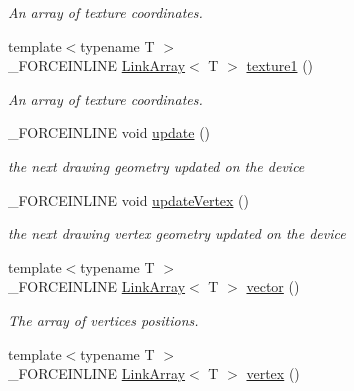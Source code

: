 \begin{DoxyCompactItemize}
\begin{DoxyCompactList}\small\item\em An array of texture coordinates. \end{DoxyCompactList}\item 
\hypertarget{classcsad_1_1_mesh_abe780b944ddb3c807305cfba8adfe5e1}{{\footnotesize template$<$typename T $>$ }\\\-\_\-\-F\-O\-R\-C\-E\-I\-N\-L\-I\-N\-E \hyperlink{classbt_1_1_link_array}{Link\-Array}$<$ T $>$ \hyperlink{classcsad_1_1_mesh_abe780b944ddb3c807305cfba8adfe5e1}{texture1} ()}\label{classcsad_1_1_mesh_abe780b944ddb3c807305cfba8adfe5e1}

\begin{DoxyCompactList}\small\item\em An array of texture coordinates. \end{DoxyCompactList}\item 
\hypertarget{classcsad_1_1_mesh_ad6361e5eabad983a785dc4503ba623dd}{\-\_\-\-F\-O\-R\-C\-E\-I\-N\-L\-I\-N\-E void \hyperlink{classcsad_1_1_mesh_ad6361e5eabad983a785dc4503ba623dd}{update} ()}\label{classcsad_1_1_mesh_ad6361e5eabad983a785dc4503ba623dd}

\begin{DoxyCompactList}\small\item\em the next drawing geometry updated on the device \end{DoxyCompactList}\item 
\hypertarget{classcsad_1_1_mesh_a44c3c64d768c4dd56e58eab5b88e65c1}{\-\_\-\-F\-O\-R\-C\-E\-I\-N\-L\-I\-N\-E void \hyperlink{classcsad_1_1_mesh_a44c3c64d768c4dd56e58eab5b88e65c1}{update\-Vertex} ()}\label{classcsad_1_1_mesh_a44c3c64d768c4dd56e58eab5b88e65c1}

\begin{DoxyCompactList}\small\item\em the next drawing vertex geometry updated on the device \end{DoxyCompactList}\item 
\hypertarget{classcsad_1_1_mesh_aa010612b3a0b8f331d97505e45d8353a}{{\footnotesize template$<$typename T $>$ }\\\-\_\-\-F\-O\-R\-C\-E\-I\-N\-L\-I\-N\-E \hyperlink{classbt_1_1_link_array}{Link\-Array}$<$ T $>$ \hyperlink{classcsad_1_1_mesh_aa010612b3a0b8f331d97505e45d8353a}{vector} ()}\label{classcsad_1_1_mesh_aa010612b3a0b8f331d97505e45d8353a}

\begin{DoxyCompactList}\small\item\em The array of vertices positions. \end{DoxyCompactList}\item 
\hypertarget{classcsad_1_1_mesh_aeaadb3131f721f29fd0b7dfdc4e10be8}{{\footnotesize template$<$typename T $>$ }\\\-\_\-\-F\-O\-R\-C\-E\-I\-N\-L\-I\-N\-E \hyperlink{classbt_1_1_link_array}{Link\-Array}$<$ T $>$ \hyperlink{classcsad_1_1_mesh_aeaadb3131f721f29fd0b7dfdc4e10be8}{vertex} ()}\label{classcsad_1_1_mesh_aeaadb3131f721f29fd0b7dfdc4e10be8}


\end{DoxyCompactItemize}

